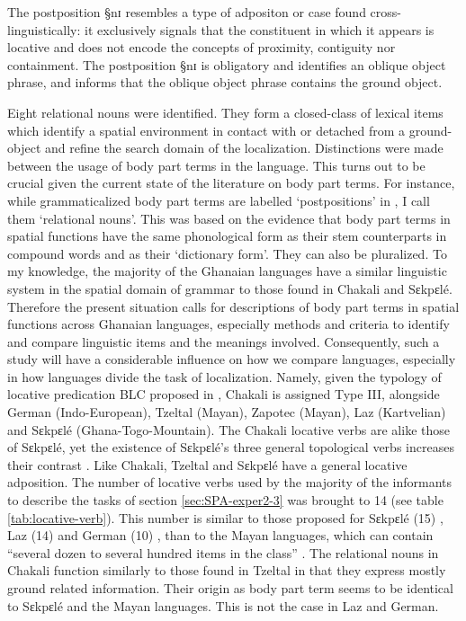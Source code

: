 The postposition {\S nɪ} resembles  a type of adpositon or case found
cross-linguistically: it  exclusively signals that the
constituent in which it appears is locative and does not encode the concepts of
proximity,
contiguity nor containment.  The
postposition {\S nɪ} is obligatory and  identifies an oblique object phrase, and
informs that the oblique object phrase contains the ground object. 

Eight
relational  nouns were identified. They form  a closed-class of lexical
items which identify a spatial environment in contact
with or detached from a ground-object and refine the search domain of the
localization. Distinctions were made between the usage of body part
terms in the language. This turns out to be crucial given the current state of
the literature on body part terms. For instance, while grammaticalized body part
terms are labelled `postpositions' in \cite{Amek07c}, I call them `relational
nouns'. This was based on the evidence that body part terms in spatial functions
 have the same phonological form as their stem counterparts in compound words
and as their `dictionary form'. They can also be pluralized. To my
knowledge, the majority of the Ghanaian languages have a similar linguistic
system in the spatial domain of grammar to those found in Chakali and Sɛkpɛlé.
Therefore the present situation calls for descriptions of body part terms in
spatial functions across Ghanaian languages, especially methods and criteria to
identify and compare  linguistic items and the meanings
involved. 
Consequently, such a study will have a considerable influence on how we compare
languages, especially in how languages divide the task of localization.
Namely,
given the typology of locative
predication  BLC proposed in  \citet[863-864]{Amek07b}, Chakali is assigned Type
III, alongside German
(Indo-European), Tzeltal (Mayan),  Zapotec (Mayan), Laz  (Kartvelian) and 
Sɛkpɛlé (Ghana-Togo-Mountain).  The Chakali locative verbs are
alike those of Sɛkpɛlé, yet the existence of Sɛkpɛlé's three general
topological
verbs increases their contrast \citep[1079]{Amek07c}. Like Chakali,  Tzeltal and
Sɛkpɛlé have a general locative adposition. The number of locative verbs 
 used by the majority of the informants 
to describe the tasks of section \ref{sec:SPA-exper2-3} was brought to
14 (see table \ref{tab:locative-verb}).
This number is similar to those proposed for Sɛkpɛlé
(15) \citep{Amek07c}, Laz (14) \citep{Kuts07}  and German (10) \citep{Kuts07b},
than to the Mayan languages, which can contain
``several dozen to several hundred items in the class'' \citep[1107]{Bohn07}.
The relational nouns in Chakali function similarly to those found in Tzeltal
\cite[243]{Brow06} in that they express mostly ground related information.
Their origin as body part term  seems to be identical to  Sɛkpɛlé and the
Mayan languages. This is not the case in  Laz  and German. 


